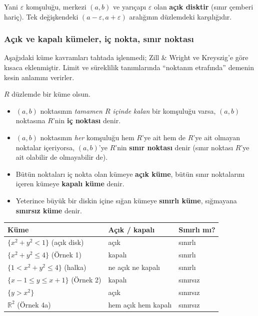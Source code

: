 Yani $\varepsilon$ komşuluğu, merkezi $(a,b)$ ve yarıçapı $\varepsilon$ olan \textbf{açık disktir} (sınır çemberi hariç).
Tek değişkendeki $(a-\varepsilon,a+\varepsilon)$ aralığının düzlemdeki karşılığıdır.

\subsubsection{Açık ve kapalı kümeler, iç nokta, sınır noktası}

\begin{bilgi}
Aşağıdaki küme kavramları tahtada işlenmedi; Zill \& Wright ve Kreyszig'e göre kısaca eklenmiştir. Limit ve süreklilik
tanımlarında ``noktanın etrafında'' demenin kesin anlamını verirler.
\end{bilgi}

\begin{tanim}
$R$ düzlemde bir küme olsun.
\begin{itemize}
  \item $(a,b)$ noktasının \emph{tamamen $R$ içinde kalan} bir komşuluğu varsa, $(a,b)$ noktasına $R$'nin
        \textbf{iç noktası} denir.
  \item $(a,b)$ noktasının \emph{her} komşuluğu hem $R$'ye ait hem de $R$'ye ait olmayan noktalar içeriyorsa, $(a,b)$'ye
        $R$'nin \textbf{sınır noktası} denir (sınır noktası $R$'ye ait olabilir de olmayabilir de).
  \item Bütün noktaları iç nokta olan kümeye \textbf{açık küme}, bütün sınır noktalarını içeren kümeye
        \textbf{kapalı küme} denir.
  \item Yeterince büyük bir diskin içine sığan kümeye \textbf{sınırlı küme}, sığmayana \textbf{sınırsız küme} denir.
\end{itemize}
\end{tanim}

\begin{center}
\begin{tabular}{l l l}
\toprule
Küme & Açık / kapalı & Sınırlı mı? \\
\midrule
$\{x^2+y^2<1\}$ (açık disk) & açık & sınırlı \\
$\{x^2+y^2\le 4\}$ (Örnek 1) & kapalı & sınırlı \\
$\{1<x^2+y^2\le 4\}$ (halka) & ne açık ne kapalı & sınırlı \\
$\{x-1\le y\le x+1\}$ (Örnek 2) & kapalı & sınırsız \\
$\{y>x^2\}$ & açık & sınırsız \\
$\mathbb R^2$ (Örnek 4a) & hem açık hem kapalı & sınırsız \\
\bottomrule
\end{tabular}
\end{center}

